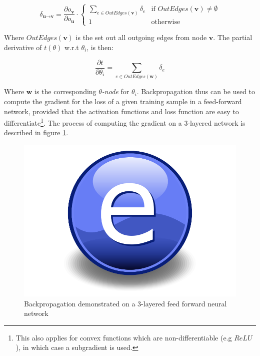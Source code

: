 \begin{equation}
    \delta_{\textbf{u}\rightarrow\textbf{v}} = \frac{\partial o_{\textbf{v}}}{\partial o_{\textbf{u}}} \cdot
    \begin{cases}
     \sum\limits_{e \in OutEdges(\textbf{v})} \delta_{e}     & \text{if $OutEdges(\textbf{v}) \neq \emptyset$}\\
    1       & \text{otherwise}
    \end{cases}
    \label{backprop}
\end{equation}

Where $OutEdges(\textbf{v})$ is the set out all outgoing edges from node $\textbf{v}$. The partial derivative of $t(\theta)$ w.r.t $\theta_i$, is then:

$$\frac{\partial t}{\partial \theta_i} = \sum\limits_{e \in OutEdges(\textbf{w})} \delta_{e} $$ 

 Where $\textbf{w}$ is the corresponding $\theta$\textit{-node} for $\theta_i$. Backpropagation thus can be used to compute the gradient for the loss of a given training sample in a feed-forward network, provided that the activation functions and loss function are easy to differentiate\footnote{This also applies for convex functions which are non-differentiable (e.g $ReLU$), in which case a subgradient is used.}. The process of computing the gradient on a 3-layered network is described in figure \ref{fig:backprop}.

\begin{figure}
    \centering
    \includegraphics{Figures/Electron.pdf}
    \caption{Backpropagation demonstrated on a 3-layered feed forward neural network}
    \label{fig:backprop}
\end{figure}

